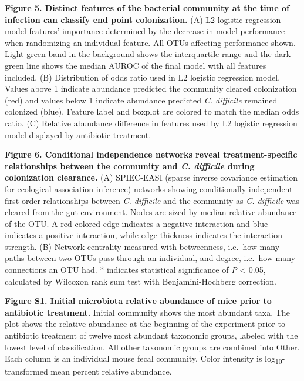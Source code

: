 \documentclass[12pt,]{article}
\begin{document}
\hfill\break

\textbf{Figure 5. Distinct features of the bacterial community at the
time of infection can classify end point colonization.} (A) L2 logistic
regression model features' importance determined by the decrease in
model performance when randomizing an individual feature. All OTUs
affecting performance shown. Light green band in the background shows
the interquartile range and the dark green line shows the median AUROC
of the final model with all features included. (B) Distribution of odds
ratio used in L2 logistic regression model. Values above 1 indicate
abundance predicted the community cleared colonization (red) and values
below 1 indicate abundance predicted \emph{C. difficile} remained
colonized (blue). Feature label and boxplot are colored to match the
median odds ratio. (C) Relative abundance difference in features used by
L2 logistic regression model displayed by antibiotic treatment.

\hfill\break

\textbf{Figure 6. Conditional independence networks reveal
treatment-specific relationships between the community and \emph{C.
difficile} during colonization clearance.} (A) SPIEC-EASI (sparse
inverse covariance estimation for ecological association inference)
networks showing conditionally independent first-order relationships
between \emph{C. difficile} and the community as \emph{C. difficile} was
cleared from the gut environment. Nodes are sized by median relative
abundance of the OTU. A red colored edge indicates a negative
interaction and blue indicates a positive interaction, while edge
thickness indicates the interaction strength. (B) Network centrality
measured with betweenness, i.e.~how many paths between two OTUs pass
through an individual, and degree, i.e.~how many connections an OTU had.
* indicates statistical significance of \emph{P} \textless{} 0.05,
calculated by Wilcoxon rank sum test with Benjamini-Hochberg correction.

\hfill\break

\textbf{Figure S1. Initial microbiota relative abundance of mice prior
to antibiotic treatment.} Initial community shows the most abundant
taxa. The plot shows the relative abundance at the beginning of the
experiment prior to antibiotic treatment of twelve most abundant
taxonomic groups, labeled with the lowest level of classification. All
other taxonomic groups are combined into Other. Each column is an
individual mouse fecal community. Color intensity is
log\textsubscript{10}-transformed mean percent relative abundance.
\end{document}
